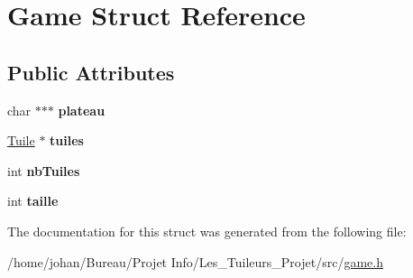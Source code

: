 \hypertarget{structGame}{}\section{Game Struct Reference}
\label{structGame}
\subsection*{Public Attributes}
\begin{DoxyCompactItemize}
\item 
char $\ast$$\ast$$\ast$ {\bfseries plateau}\hypertarget{structGame_afc048f31da078c87fa7d381c9673f31d}{}\label{structGame_afc048f31da078c87fa7d381c9673f31d}

\item 
\hyperlink{structTuile}{Tuile} $\ast$ {\bfseries tuiles}\hypertarget{structGame_ac3fb01df4e1e340920e8b97b34d0db0b}{}\label{structGame_ac3fb01df4e1e340920e8b97b34d0db0b}

\item 
int {\bfseries nb\+Tuiles}\hypertarget{structGame_a119de7a9121b7142cd5db52803ae3977}{}\label{structGame_a119de7a9121b7142cd5db52803ae3977}

\item 
int {\bfseries taille}\hypertarget{structGame_ada885d65654c46afafd089933d842b97}{}\label{structGame_ada885d65654c46afafd089933d842b97}

\end{DoxyCompactItemize}


The documentation for this struct was generated from the following file\+:\begin{DoxyCompactItemize}
\item 
/home/johan/\+Bureau/\+Projet Info/\+Les\+\_\+\+Tuileurs\+\_\+\+Projet/src/\hyperlink{game_8h}{game.\+h}\end{DoxyCompactItemize}
